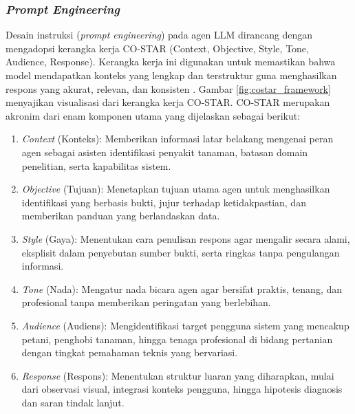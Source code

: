 \subsubsection{\textit{Prompt Engineering}}
Desain instruksi (\textit{prompt engineering}) pada agen LLM dirancang dengan mengadopsi kerangka kerja CO-STAR (Context, Objective, Style, Tone, Audience, Response). Kerangka kerja ini digunakan untuk memastikan bahwa model mendapatkan konteks yang lengkap dan terstruktur guna menghasilkan respons yang akurat, relevan, dan konsisten \parencite{govtechsingaporeCOSTARPromptEngineering2024}. Gambar \ref{fig:costar_framework} menyajikan visualisasi dari kerangka kerja CO-STAR. CO-STAR merupakan akronim dari enam komponen utama yang dijelaskan sebagai berikut:
\begin{enumerate}[nosep]
    \item \textit{Context} (Konteks): Memberikan informasi latar belakang mengenai peran agen sebagai asisten identifikasi penyakit tanaman, batasan domain penelitian, serta kapabilitas sistem.
    \item \textit{Objective} (Tujuan): Menetapkan tujuan utama agen untuk menghasilkan identifikasi yang berbasis bukti, jujur terhadap ketidakpastian, dan memberikan panduan yang berlandaskan data.
    \item \textit{Style} (Gaya): Menentukan cara penulisan respons agar mengalir secara alami, eksplisit dalam penyebutan sumber bukti, serta ringkas tanpa pengulangan informasi.
    \item \textit{Tone} (Nada): Mengatur nada bicara agen agar bersifat praktis, tenang, dan profesional tanpa memberikan peringatan yang berlebihan.
    \item \textit{Audience} (Audiens): Mengidentifikasi target pengguna sistem yang mencakup petani, penghobi tanaman, hingga tenaga profesional di bidang pertanian dengan tingkat pemahaman teknis yang bervariasi.
    \item \textit{Response} (Respons): Menentukan struktur luaran yang diharapkan, mulai dari observasi visual, integrasi konteks pengguna, hingga hipotesis diagnosis dan saran tindak lanjut.
\end{enumerate}
